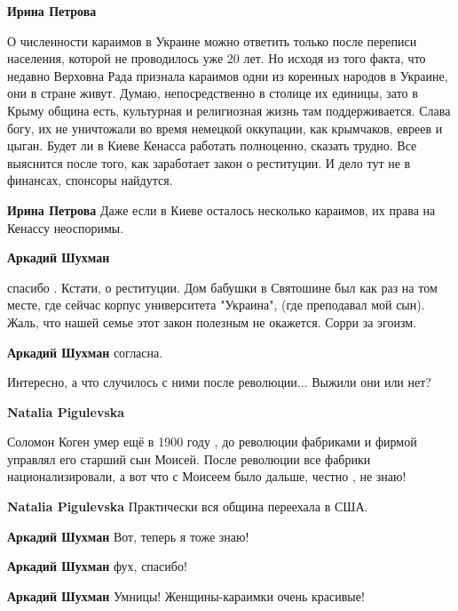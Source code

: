 \begin{itemize}
\begin{itemize}
\begin{itemize} %
\textbf{Ирина Петрова} 

О численности караимов в Украине можно ответить только после переписи
населения, которой не проводилось уже 20 лет. Но исходя из того факта, что
недавно Верховна Рада признала караимов одни из коренных народов в Украине, они
в стране живут. Думаю, непосредственно в столице их единицы, зато в Крыму община
есть, культурная и религиозная жизнь там поддерживается. Слава богу, их не
уничтожали во время немецкой оккупации, как крымчаков, евреев и цыган. Будет ли
в Киеве Кенасса работать полноценно, сказать трудно. Все выяснится после того,
как заработает закон о реституции. И дело тут не в финансах, спонсоры найдутся.

\textbf{Ирина Петрова} Даже если в Киеве осталось несколько караимов, их права на Кенассу неоспоримы.
\end{itemize} %

\textbf{Аркадий Шухман} 

спасибо . Кстати, о реституции. Дом бабушки в Святошине был как раз на том
месте, где сейчас корпус университета "Украина", (где преподавал мой сын).
Жаль, что нашей семье этот закон полезным не окажется. Сорри за эгоизм.

\textbf{Аркадий Шухман} согласна.

\end{itemize} %

Интересно, а что случилось с ними после революции... Выжили они или нет?

\begin{itemize} %
\textbf{Natalia Pigulevska} 

Соломон Коген умер ещё в 1900 году , до революции фабриками и фирмой управлял
его старший сын Моисей. После революции все фабрики национализировали, а вот
что с Моисеем было дальше, честно , не знаю!

\textbf{Natalia Pigulevska} Практически вся община переехала в США.

\begin{itemize} %
\textbf{Аркадий Шухман} Вот, теперь я тоже знаю!

\textbf{Аркадий Шухман} фух, спасибо!

\textbf{Аркадий Шухман} Умницы! Женщины-караимки очень красивые!
\end{itemize} %


\end{itemize}
\end{itemize}
